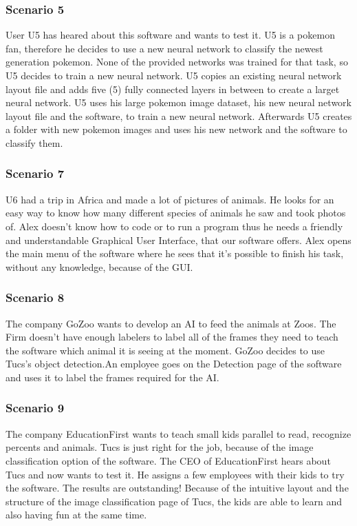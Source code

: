 \documentclass[parskip=full]{scrartcl}
\begin{document}
\subsubsection{Scenario 5}
User U5 has heared about this software and wants to test it.
U5 is a pokemon fan, therefore he decides to use a new neural network to classify the newest generation pokemon. None of the provided networks was trained for that task, so U5 decides to train a new neural network. U5 copies an existing neural network layout file and adds five (5) fully connected layers in between to create a larget neural network. U5 uses his large pokemon image dataset, his new neural network layout file and the software, to train a new neural network. 
Afterwards U5 creates a folder with new pokemon images and uses his new network and the software to classify them.
\subsubsection{Scenario 7}
U6 had a trip in Africa and made a lot of pictures of animals. He looks for an easy way to know how many different species of animals he saw and took photos of. Alex doesn't know how to code or to run a program thus he needs a friendly and understandable Graphical User Interface, that our software offers. Alex opens the main menu of the software where he sees that it's possible to finish his task, without any knowledge, because of the GUI. 
\subsubsection{Scenario 8}
The company GoZoo wants to develop an AI to feed the animals at Zoos. The Firm doesn't have enough labelers to label all of the frames they need to teach the software which animal it is seeing at the moment. GoZoo decides to use Tucs's object detection.An employee goes on the Detection page of the software and uses it to label the frames required for the AI.
\clearpage
\subsubsection{Scenario 9}
The company EducationFirst wants to teach small kids parallel to read, recognize percents and animals. Tucs is just right for the job, because of the \gls{image classification} option of the software. The CEO of EducationFirst hears about Tucs and now wants to test it. He assigns a few employees with their kids to try the software. The results are outstanding! Because of the intuitive layout and the structure of the \gls{image classification} page of Tucs, the kids are able to learn and also having fun at the same time.
\clearpage
\end{document}
